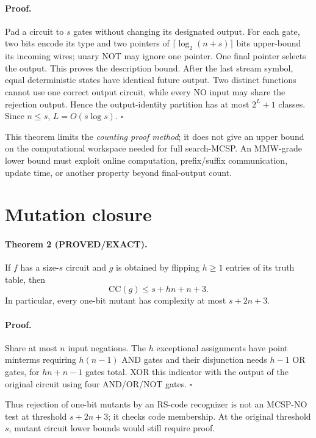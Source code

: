 \documentclass[11pt]{article}
\begin{document}
\paragraph{Proof.}
Pad a circuit to $s$ gates without changing its designated output.  For each
gate, two bits encode its type and two pointers of
$\lceil\log_2(n+s)\rceil$ bits upper-bound its incoming wires; unary NOT may
ignore one pointer.  One final pointer selects the output.  This proves the
description bound.  After the last stream symbol, equal deterministic states
have identical future output.  Two distinct functions cannot use one correct
output circuit, while every NO input may share the rejection output.  Hence
the output-identity partition has at most $2^L+1$ classes.  Since $n\le s$,
$L=O(s\log s)$.  \hfill$\square$

This theorem limits the \emph{counting proof method}; it does not give an
upper bound on the computational workspace needed for full search-MCSP.
An MMW-grade lower bound must exploit online computation, prefix/suffix
communication, update time, or another property beyond final-output count.

\section*{Mutation closure}
\paragraph{Theorem 2 (\textbf{PROVED/EXACT}).}
If $f$ has a size-$s$ circuit and $g$ is obtained by flipping $h\ge1$ entries
of its truth table, then
\[
 \mathrm{CC}(g)\le s+hn+n+3.
\]
In particular, every one-bit mutant has complexity at most $s+2n+3$.

\paragraph{Proof.}
Share at most $n$ input negations.  The $h$ exceptional assignments have
point minterms requiring $h(n-1)$ AND gates and their disjunction needs
$h-1$ OR gates, for $hn+n-1$ gates total.  XOR this indicator with the output
of the original circuit using four AND/OR/NOT gates.  \hfill$\square$

Thus rejection of one-bit mutants by an RS-code recognizer is not an MCSP-NO
test at threshold $s+2n+3$; it checks code membership.  At the original
threshold $s$, mutant circuit lower bounds would still require proof.
\end{document}
